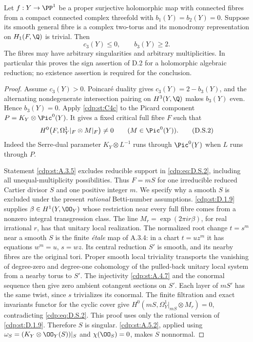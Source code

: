 
\begin{proposition}\label{cdp:st:D.2.5}

Let $f:Y\to\PP^1$ be a proper surjective holomorphic map with
connected fibres from a compact connected complex threefold with
$b_1(Y)=b_2(Y)=0$. Suppose its smooth general fibre is a complex
two-torus and its monodromy representation on $H_1(F,\Q)$ is
trivial. Then
\[
 c_3(Y)\le0,\qquad b_3(Y)\ge2.
 \tag{D.S.1}\label{cdp:eq:D.S.1}
\]
The fibres may have arbitrary singularities and arbitrary
multiplicities. In particular this proves the sign assertion of
D.2 for a holomorphic algebraic reduction; no existence assertion
is required for the conclusion.
\end{proposition}
\begin{proof}
Assume $c_3(Y)>0$. Poincar\'e duality gives
$c_3(Y)=2-b_3(Y)$, and the alternating nondegenerate intersection
pairing on $H^3(Y,\Q)$ makes $b_3(Y)$ even. Hence $b_3(Y)=0$.
Apply \ref{cdp:st:C4c} to the Picard component
$P=K_Y\otimes\Pic^0(Y)$. It gives a fixed critical full fibre
$F$ such that
\[
 H^0\bigl(F,\Omega_Y^1|_F\otimes M|_F\bigr)\ne0
 \qquad(M\in\Pic^0(Y)).
 \tag{D.S.2}\label{cdp:eq:D.S.2}
\]
Indeed the Serre-dual parameter $K_Y\otimes L^{-1}$ runs through
$\Pic^0(Y)$ when $L$ runs through $P$.

Statement \ref{cdp:st:A.3.5} excludes reducible support in \eqref{cdp:eq:D.S.2}, including
all unequal-multiplicity possibilities. Thus $F=mS$ for one
irreducible reduced Cartier divisor $S$ and one positive integer
$m$. We specify why a smooth $S$ is excluded under the present
\emph{rational} Betti-number assumptions. \ref{cdp:st:D.1.9} supplies
$\beta\in H^1(Y,\OO_Y)$ whose restriction near every full fibre
comes from a nonzero integral transgression class. The line
$M_r=\exp(2\pi i r\beta)$, for real irrational $r$, has that
unitary local realization. The normalized root change $t=s^m$
near a smooth $S$ is the finite \emph{\'etale} map of A.3.4:
in a chart $t=uz^m$ it has equations $w^m=u$, $s=wz$.
Its central reduction $S'$ is smooth, and its nearby fibres are
the original tori. Proper smooth local triviality transports
the vanishing of degree-zero and degree-one cohomology of the
pulled-back unitary local system from a nearby torus to $S'$.
The injectivity \ref{cdp:st:A.4.7} and the conormal sequence then give zero
ambient cotangent sections on $S'$. Each layer of $mS'$ has the
same twist, since $s$ trivializes its conormal. The finite
filtration and exact invariants functor for the cyclic cover
give $H^0(mS,\Omega_Y^1|_{mS}\otimes M_r)=0$, contradicting
\eqref{cdp:eq:D.S.2}. This proof uses only the rational version of \ref{cdp:st:D.1.9}.
Therefore $S$ is singular. \ref{cdp:st:A.5.2}, applied using
$\omega_S=(K_Y\otimes\OO_Y(S))|_S$ and
$\chi(\OO_S)=0$, makes $S$ nonnormal.


\end{proof}
